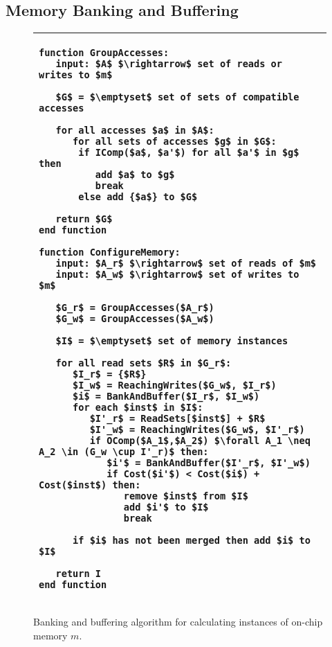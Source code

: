 \subsection{Memory Banking and Buffering}
\label{banking-appendix}

\begin{figure}
\hspace{5pt}
\begin{tabular}{l}
\hline\hline

{\begin{lstlisting}[language=Pseudo,linewidth=0.98\columnwidth, mathescape=true]
function GroupAccesses:
   input: $A$ $\rightarrow$ set of reads or writes to $m$
   
   $G$ = $\emptyset$ set of sets of compatible accesses
   
   for all accesses $a$ in $A$:
      for all sets of accesses $g$ in $G$:
       if IComp($a$, $a'$) for all $a'$ in $g$ then
          add $a$ to $g$
          break
       else add {$a$} to $G$
   
   return $G$
end function

function ConfigureMemory:
   input: $A_r$ $\rightarrow$ set of reads of $m$
   input: $A_w$ $\rightarrow$ set of writes to $m$
   
   $G_r$ = GroupAccesses($A_r$)
   $G_w$ = GroupAccesses($A_w$)
   
   $I$ = $\emptyset$ set of memory instances
   
   for all read sets $R$ in $G_r$: 
      $I_r$ = {$R$}
      $I_w$ = ReachingWrites($G_w$, $I_r$)
      $i$ = BankAndBuffer($I_r$, $I_w$)
      for each $inst$ in $I$:
         $I'_r$ = ReadSets[$inst$] + $R$
         $I'_w$ = ReachingWrites($G_w$, $I'_r$)
         if OComp($A_1$,$A_2$) $\forall A_1 \neq A_2 \in (G_w \cup I'_r)$ then:
            $i'$ = BankAndBuffer($I'_r$, $I'_w$)
            if Cost($i'$) < Cost($i$) + Cost($inst$) then:
               remove $inst$ from $I$
               add $i'$ to $I$
               break

      if $i$ has not been merged then add $i$ to $I$ 

   return I
end function
\end{lstlisting}}\\
\hline
\end{tabular}
\vspace{-10pt}
\caption{Banking and buffering algorithm for calculating instances of on-chip memory $m$.
\vspace{-10pt}
}
\label{fig:bank_alg}
\end{figure}

